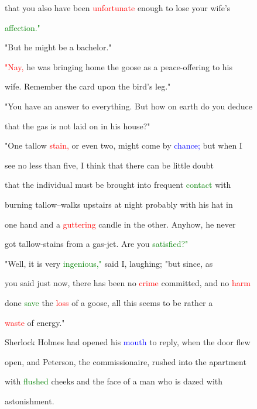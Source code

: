  that you also have been \textcolor{red}{unfortunate} enough to \textcolor{BurntOrange}{lose} your wife's

 \textcolor{green}{affection."}



 "But he might be a bachelor."



 \textcolor{red}{"Nay,} he was bringing home the goose as a peace-offering to his

 wife. Remember the card upon the bird's leg."



 "You have an answer to everything. But how on earth do you deduce

 that the gas is not laid on in his house?"



 "One tallow \textcolor{red}{stain,} or even two, might come by \textcolor{blue}{chance;} but when I

 see no less than five, I think that there can be little \textcolor{BurntOrange}{doubt}

 that the individual must be brought into frequent \textcolor{green}{contact} with

 burning tallow--walks upstairs at night probably with his hat in

 one hand and a \textcolor{red}{guttering} candle in the other. Anyhow, he never

 got tallow-stains from a gas-jet. Are you \textcolor{green}{satisfied?"}



 "Well, it is very \textcolor{green}{ingenious,"} said I, \textcolor{BurntOrange}{laughing;} "but since, as

 you said just now, there has been no \textcolor{red}{crime} committed, and no \textcolor{red}{harm}

 done \textcolor{green}{save} the \textcolor{red}{loss} of a goose, all this seems to be rather a

 \textcolor{red}{waste} of energy."



 Sherlock Holmes had opened his \textcolor{blue}{mouth} to reply, when the door flew

 open, and Peterson, the commissionaire, rushed into the apartment

 with \textcolor{green}{flushed} cheeks and the face of a man who is dazed with

 \textcolor{BurntOrange}{astonishment.}



